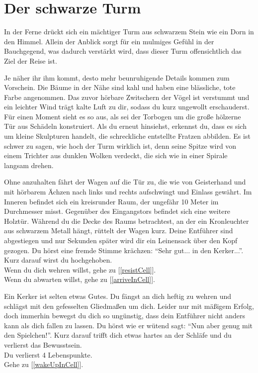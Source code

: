 \chapter{Der schwarze Turm}


In der Ferne drückt sich ein mächtiger Turm aus schwarzem Stein wie ein Dorn in den Himmel. Allein der Anblick sorgt für ein mulmiges Gefühl in der Bauchgegend, was dadurch verstärkt wird, dass dieser Turm offensichtlich das Ziel der Reise ist.

Je näher ihr ihm kommt, desto mehr beunruhigende Details kommen zum Vorschein. Die Bäume in der Nähe sind kahl und haben eine blässliche, tote Farbe angenommen. Das zuvor hörbare Zwitschern der Vögel ist verstummt und ein leichter Wind trägt kalte Luft zu dir, sodass du kurz ungewollt erschauderst. Für einen Moment sieht es so aus, als sei der Torbogen um die große hölzerne Tür aus Schädeln konstruiert. Als du erneut hinsiehst, erkennst du, dass es sich um kleine Skulpturen handelt, die schreckliche entstellte Fratzen abbilden. Es ist schwer zu sagen, wie hoch der Turm wirklich ist, denn seine Spitze wird von einem Trichter aus dunklen Wolken verdeckt, die sich wie in einer Spirale langsam drehen.

Ohne anzuhalten fährt der Wagen auf die Tür zu, die wie von Geisterhand und mit hörbarem Ächzen nach links und rechts aufschwingt und Einlass gewährt. Im Inneren befindet sich ein kreisrunder Raum, der ungefähr 10 Meter im Durchmesser misst. Gegenüber des Eingangstors befindet sich eine weitere Holztür. Während du die Decke des Raums betrachtest, an der ein Kronleuchter aus schwarzem Metall hängt, rüttelt der Wagen kurz. Deine Entführer sind abgestiegen und nur Sekunden später wird dir ein Leinensack über den Kopf gezogen. Du hörst eine fremde Stimme krächzen: ``Sehr gut... in den Kerker...''. Kurz darauf wirst du hochgehoben.
\\Wenn du dich wehren willst, gehe zu [\ref{resistCell}].
\\Wenn du abwarten willst, gehe zu [\ref{arriveInCell}].


Ein Kerker ist selten etwas Gutes. Du fängst an dich heftig zu wehren und schlägst mit den gefesselten Gliedmaßen um dich. Leider nur mit mäßigem Erfolg, doch immerhin bewegst du dich so ungünstig, dass dein Entführer nicht anders kann als dich fallen zu lassen. Du hörst wie er wütend sagt: ``Nun aber genug mit den Spielchen!''. Kurz darauf trifft dich etwas hartes an der Schläfe und du verlierst das Bewusstsein.\\
Du verlierst 4 Lebenspunkte.
\\Gehe zu [\ref{wakeUpInCell}].

